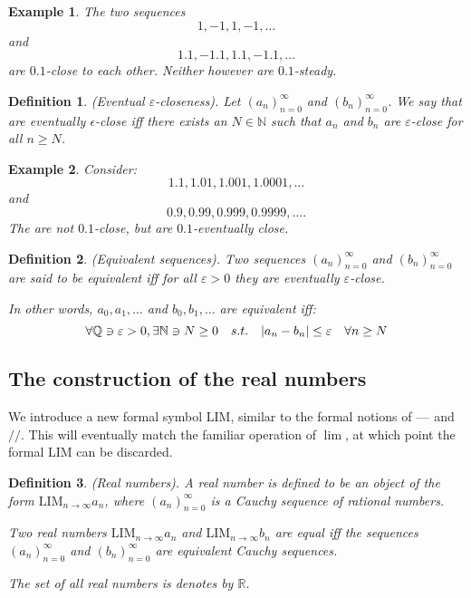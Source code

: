 \documentclass{article}
\newtheorem{example}{Example}[subsection]
\newtheorem{definition}{Definition}[subsection]
\newcommand{\R}{\mathbb{R}}
\newcommand{\Q}{\mathbb{Q}}
\newcommand{\N}{\mathbb{N}}
\newcommand{\mem}{\text{\textemdash}} %
\newcommand{\vep}{\varepsilon} %
\newcommand{\leftin}{\mathrel{\reflectbox{$\in$}}}
\newcommand{\LIM}{\mathrm{LIM}}
\begin{document}
\begin{example}
	The two sequences
	$$
	1,-1,1,-1,\dots
	$$
	and
	$$
	1.1,-1.1,1.1,-1.1,\dots
	$$
	are $0.1$-close to each other. Neither however are 
	$0.1$-steady.
\end{example}


\begin{definition}
	(Eventual $\vep$-closeness). Let $(a_n)_{n=0}^\infty$ and
	$(b_n)_{n=0}^\infty$. We say that are eventually $\epsilon$-close
	iff there exists an $N \in \N$ such that $a_n$ and $b_n$ are
	$\vep$-close for all $n \geq N$.
\end{definition}

\begin{example}
	Consider: 
	$$
	1.1, 1.01, 1.001, 1.0001, \dots
	$$
	and
	$$
	0.9, 0.99, 0.999, 0.9999, \dots.
	$$
	The are not $0.1$-close, but are $0.1$-eventually close.
\end{example}

\begin{definition}
	(Equivalent sequences). Two sequences $(a_n)_{n=0}^\infty$ and	
	$(b_n)_{n=0}^\infty$ are said to be equivalent iff for all 
	$\vep > 0$ they are eventually $\vep$-close.

	In other words, $a_0, a_1, \dots$ and $b_0, b_1, \dots$ are
	equivalent iff:
	$$
	\forall \Q \leftin \vep > 0, \exists\N\leftin N \geq 0 \quad
	s.t.\quad |a_n - b_n| \leq \vep \quad \forall n \geq N
	$$
\end{definition}




\subsection{The construction of the real numbers}

We introduce a new formal symbol $\LIM$, similar to the formal notions
of $\mem$ and $//$. This will eventually match the familiar operation
of $\lim$, at which point the formal $\LIM$ can be discarded.

\begin{definition}
	(Real numbers). A real number is defined to be an 
	object of the form $\LIM_{n\to\infty} a_n$, where 
	$(a_n)_{n=0}^\infty$ is a Cauchy sequence of rational
	numbers. 

	Two real numbers $\LIM_{n\to\infty} a_n$ and
	$\LIM_{n\to\infty} b_n$ are equal iff the sequences\\
	$(a_n)_{n=0}^\infty$ and $(b_n)_{n=0}^\infty$ are
	equivalent Cauchy sequences. 

	The set of all real numbers is denotes by $\R$.
\end{definition}
\end{document}
